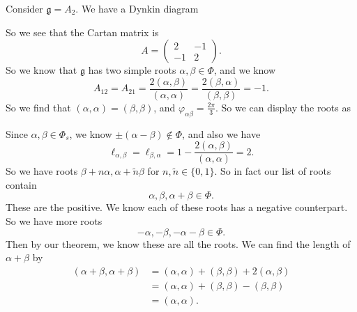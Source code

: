 \documentclass[a4paper]{article}
\begin{document}
\begin{eg}
  Consider $\mathfrak{g} = A_2$. We have a Dynkin diagram
  \begin{center}
  \end{center}
  So we see that the Cartan matrix is
  \[
    A =
    \begin{pmatrix}
      2 & -1\\
      -1 & 2
    \end{pmatrix}.
  \]
  So we know that $\mathfrak{g}$ has two simple roots $\alpha, \beta \in \Phi$, and we know
  \[
    A_{12} = A_{21} = \frac{2(\alpha, \beta)}{(\alpha, \alpha)} = \frac{2(\beta, \alpha)}{(\beta, \beta)} = -1.
  \]
  So we find that $(\alpha, \alpha) = (\beta, \beta)$, and $\varphi_{\alpha\beta} = \frac{2\pi}{3}$. So we can display the roots as
  \begin{center}
  \end{center}
  Since $\alpha, \beta \in \Phi_s$, we know $\pm(\alpha - \beta) \not\in \Phi$, and also we have
  \[
    \ell_{\alpha, \beta} = \ell_{\beta, \alpha} = 1 - \frac{2 (\alpha, \beta)}{(\alpha, \alpha)} = 2.
  \]
  So we have roots $\beta + n \alpha, \alpha + \tilde{n}\beta$ for $n, \tilde{n} \in \{0, 1\}$. So in fact our list of roots contain
  \[
    \alpha, \beta, \alpha + \beta \in \Phi.
  \]
  These are the positive. We know each of these roots has a negative counterpart. So we have more roots
  \[
    -\alpha, -\beta, -\alpha - \beta \in \Phi.
  \]
  Then by our theorem, we know these are all the roots. We can find the length of $\alpha + \beta$ by
  \begin{align*}
    (\alpha + \beta, \alpha + \beta) &= (\alpha, \alpha) + (\beta, \beta) + 2(\alpha, \beta)\\
    &= (\alpha, \alpha) + (\beta, \beta) - (\beta, \beta)\\
    &= (\alpha, \alpha).
  \end{align*}

\end{eg}
\end{document}
